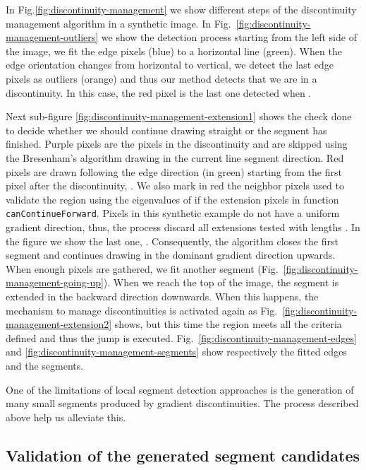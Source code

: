\documentclass[preprint,12pt]{elsarticle}
\begin{document}
In Fig.\ref{fig:discontinuity-management} we show different steps of the discontinuity management algorithm in a synthetic image. 
In Fig.~\ref{fig:discontinuity-management-outliers} we show the detection process starting from the left side of the image, we fit the edge pixels (blue) to a horizontal line (green). When the edge orientation changes from horizontal to vertical, we detect the last edge pixels as outliers (orange) and thus our method detects that we are in a discontinuity. In this case, the red pixel is the last one detected when .

Next sub-figure \ref{fig:discontinuity-management-extension1} shows the check done to decide whether we should continue drawing straight or the segment has finished. Purple pixels are the pixels in the discontinuity and are skipped using the Bresenham's algorithm drawing in the current line segment direction. Red pixels are drawn following the edge direction (in green) starting from the first pixel after the discontinuity, . We also mark in red the neighbor pixels used to validate the region using the eigenvalues of  if the extension pixels in function \texttt{canContinueForward}. Pixels in this synthetic example do not have a uniform gradient direction, thus, the process discard all extensions tested with lengths . In the figure we show the last one, . Consequently, the algorithm closes the first segment and continues drawing in the dominant gradient direction upwards. 
When enough pixels are gathered, we fit another segment (Fig.~\ref{fig:discontinuity-management-going-up}). When we reach the top of the image, the segment is extended in the backward direction downwards. When this happens, the mechanism to manage discontinuities is activated again as Fig.~\ref{fig:discontinuity-management-extension2} shows, but this time the region meets all the criteria defined and thus the jump is executed. Fig.~\ref{fig:discontinuity-management-edges} and \ref{fig:discontinuity-management-segments} show respectively the fitted edges and the segments.

One of the limitations of local segment detection approaches is the generation of many small segments produced by gradient discontinuities. The process described above help us alleviate this.

\subsection{Validation of the generated segment candidates}
\label{sec:method-validation}
\end{document}
